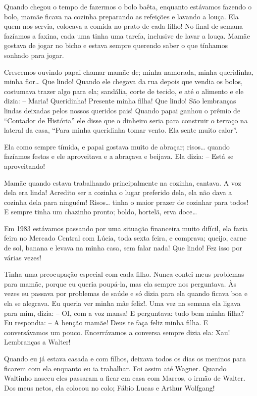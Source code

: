 \documentclass[
  brazil,
  a6paper,
  oneside,
  landscape,
  14pt]{scrbook}
\begin{document}
Quando chegou o tempo de fazermos o bolo baêta, enquanto estávamos
fazendo o bolo, mamãe ficava na cozinha preparando as refeições e
lavando a louça. Ela quem nos servia, colocava a comida no prato de cada
filho! No final de semana fazíamos a faxina, cada uma tinha uma tarefa,
inclusive de lavar a louça. Mamãe gostava de jogar no bicho e estava
sempre querendo saber o que tínhamos sonhado para jogar.

Crescemos ouvindo papai chamar mamãe de; minha namorada, minha
queridinha, minha flor\ldots{} Que lindo! Quando ele chegava da rua
depois que vendia os bolos, costumava trazer algo para ela; sandália,
corte de tecido, e até o alimento e ele dizia: -- Maria! Queridinha!
Presente minha filha! Que lindo! São lembranças lindas deixadas pelos
nossos queridos pais! Quando papai ganhou o prêmio de ``Contador de
História'' ele disse que o dinheiro seria para construir o terraço na
lateral da casa, ``Para minha queridinha tomar vento. Ela sente muito
calor''.

Ela como sempre tímida, e papai gostava muito de abraçar; risos\ldots{}
quando fazíamos festas e ele aproveitava e a abraçava e beijava. Ela
dizia: -- Está se aproveitando!

Mamãe quando estava trabalhando principalmente na cozinha, cantava. A
voz dela era linda! Acredito ser a cozinha o lugar preferido dela, ela
não dava a cozinha dela para ninguém! Risos\ldots{} tinha o maior prazer
de cozinhar para todos! E sempre tinha um chazinho pronto; boldo,
hortelã, erva doce\ldots{}

Em 1983 estávamos passando por uma situação financeira muito difícil,
ela fazia feira no Mercado Central com Lúcia, toda sexta feira, e
comprava; queijo, carne de sol, banana e levava na minha casa, sem falar
nada! Que lindo! Fez isso por várias vezes!

Tinha uma preocupação especial com cada filho. Nunca contei meus
problemas para mamãe, porque eu queria poupá-la, mas ela sempre nos
perguntava. Às vezes eu passava por problemas de saúde e só dizia para
ela quando ficava boa e ela se alegrava. Eu queria ver minha mãe feliz!.
Uma vez na semana ela ligava para mim, dizia: -- OI, com a voz mansa! E
perguntava: tudo bem minha filha? Eu respondia: -- A benção mamãe! Deus
te faça feliz minha filha. E conversávamos um pouco. Encerrávamos a
conversa sempre dizia ela: Xau! Lembranças a Walter!

Quando eu já estava casada e com filhos, deixava todos os dias os
meninos para ficarem com ela enquanto eu ia trabalhar. Foi assim até
Wagner. Quando Waltinho nasceu eles passaram a ficar em casa com Marcos,
o irmão de Walter. Dos meus netos, ela colocou no colo; Fábio Lucas e
Arthur Wolfgang!
\end{document}
